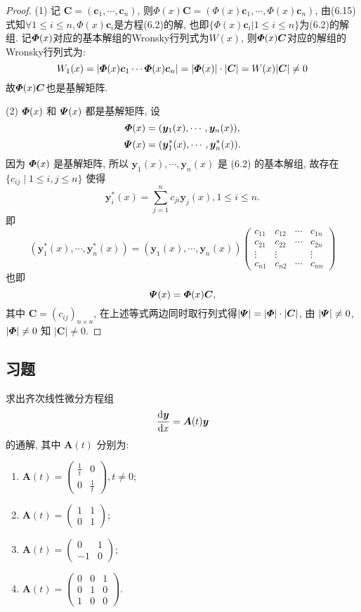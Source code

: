 \begin{proof}
(1) 记 $\bm{C}=(\bm{c}_1,\cdots,\bm{c}_n)$, 则$\bm{\varPhi}(x)\bm{C}=(\bm{\varPhi}(x)\bm{c}_1,\cdots,\bm{\varPhi}(x)\bm{c}_n)$, 由(6.15)式知$\forall1\leq i\leq n,\bm{\varPhi}(x)\bm{c}_i$是方程(6.2)的解, 也即$\{\bm{\varPhi}(x)\bm{c}_i|1\leq i\leq n\}$为(6.2)的解组. 记$\bm{\varPhi}(x)$对应的基本解组的Wronsky行列式为$W(x)$, 则$\bm{\varPhi}(x)\bm{C}$对应的解组的Wronsky行列式为:
\[W_1(x)=|\bm{\varPhi}(x)\bm{c}_1\cdots\bm{\varPhi}(x)\bm{c}_n|=|\bm{\varPhi}(x)|\cdot|\bm{C}|=W(x)|\bm{C}|\neq0\]
故$\bm{\varPhi}(x)\bm{C}$也是基解矩阵.

(2) $\bm{\varPhi}(x)$ 和 $\bm{\varPsi}(x)$ 都是基解矩阵, 设
\[\bm{\varPhi}(x)=(\bm{y}_1(x),\cdots,\bm{y}_n(x)),\]
\[\bm{\varPsi}(x)=(\bm{y}_1^*(x),\cdots,\bm{y}_n^*(x)).\]
因为 $\bm{\varPhi}(x)$ 是基解矩阵, 所以 $\bm{y}_1(x),\cdots,\bm{y}_n(x)$ 是 (6.2) 的基本解组, 
故存在 $\{c_{ij}\mid 1\leq i,j\leq n\}$ 使得
\[\bm{y}_i^*(x)=\sum_{j=1}^nc_{ji}\bm{y}_j(x),1\leq i\leq n.\]
即
\[(\bm{y}_1^*(x),\cdots,\bm{y}_n^*(x)) = (\bm{y}_1(x),\cdots,\bm{y}_n(x))
\begin{pmatrix}
  c_{11}&c_{12}&\cdots&c_{1n}\\
  c_{21}&c_{22}&\cdots&c_{2n}\\
  \vdots&\vdots&&\vdots\\
  c_{n1}&c_{n2}&\cdots&c_{nn}
\end{pmatrix}\]
也即
\[\bm{\varPsi}(x)=\bm{\varPhi}(x)\bm{C},\]
其中 $\bm{C}=(c_{ij})_{n\times n}$, 在上述等式两边同时取行列式得$|\bm{\varPsi}|=|\bm{\varPhi}|\cdot|\bm{C}|$, 
由 $|\bm{\varPsi}|\neq 0$, $|\bm{\varPhi}|\neq 0$ 知 $|\bm{C}|\neq 0$.
\end{proof}



\subsection{习题}



\begin{exercise}
  求出齐次线性微分方程组
  \[\frac{\mathop{}\!\mathrm{d}\bm{y}}{\mathop{}\!\mathrm{d} x}=\bm{A}(t)\bm{y}\]
  的通解, 其中 $\bm{A}(t)$ 分别为:
  \begin{enumerate}[(1)]
  \item $\displaystyle\bm{A}(t)=\begin{pmatrix}\frac{1}{t}&0\\0&\frac{1}{t}\end{pmatrix},t\neq0$;
  \item $\displaystyle\bm{A}(t)=\begin{pmatrix}1&1\\0&1\end{pmatrix}$;
  \item $\displaystyle\bm{A}(t)=\begin{pmatrix}0&1\\-1&0\end{pmatrix}$;
  \item $\displaystyle\bm{A}(t)=\begin{pmatrix}0&0&1\\0&1&0\\1&0&0\end{pmatrix}$.
  \end{enumerate}
\end{exercise}

